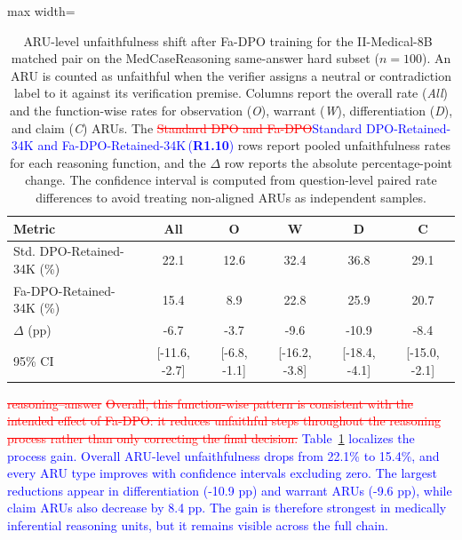 \documentclass[a4paper,fleqn,doubleblind]{cas-sc}
\DeclareRobustCommand{\deleted}[1]{\textcolor{red}{\sout{#1}}}
\DeclareRobustCommand{\added}[1]{\textcolor{blue}{#1}}
\DeclareRobustCommand{\revtag}[1]{\textcolor{blue}{\scriptsize\,(\textbf{#1})}}
\begin{document}
\begin{table}[htbp]
    \centering
    \footnotesize
    \caption[ARU-level unfaithfulness shift after Fa-DPO training.]{ARU-level unfaithfulness shift after Fa-DPO training for the II-Medical-8B~\cite{intelligentinternet2025iimedical8b} matched pair on the MedCaseReasoning same-answer hard subset ($n=100$). An ARU is counted as unfaithful when the verifier assigns a neutral or contradiction label to it against its verification premise. Columns report the overall rate (\textit{All}) and the function-wise rates for observation (\textit{O}), warrant (\textit{W}), differentiation (\textit{D}), and claim (\textit{C}) ARUs. The \deleted{Standard DPO and Fa-DPO}\added{Standard DPO-Retained-34K and Fa-DPO-Retained-34K}\revtag{R1.10} rows report pooled unfaithfulness rates for each reasoning function, and the $\Delta$ row reports the absolute percentage-point change. The confidence interval is computed from question-level paired rate differences to avoid treating non-aligned ARUs as independent samples.}
    \label{tab:iimedical_aru_shift}
    \begin{adjustbox}{max width=\columnwidth}
    \begin{tabular}{lccccc}
        \toprule
        \textbf{Metric} & \textbf{All} & \textbf{O} & \textbf{W} & \textbf{D} & \textbf{C} \\
        \midrule
        Std. DPO-Retained-34K (\%) & 22.1 & 12.6 & 32.4 & 36.8 & 29.1 \\
        Fa-DPO-Retained-34K (\%) & 15.4 & 8.9 & 22.8 & 25.9 & 20.7 \\
        $\Delta$ (pp) & -6.7 & -3.7 & -9.6 & -10.9 & -8.4 \\
        95\% CI & [-11.6, -2.7] & [-6.8, -1.1] & [-16.2, -3.8] & [-18.4, -4.1] & [-15.0, -2.1] \\
        \bottomrule
    \end{tabular}
    \end{adjustbox}
\end{table}

\deleted{reasoning--answer}
\deleted{Overall, this function-wise pattern is consistent with the intended effect of Fa-DPO: it reduces unfaithful steps throughout the reasoning process rather than only correcting the final decision.}
\added{Table~\ref{tab:iimedical_aru_shift} localizes the process gain. Overall ARU-level unfaithfulness drops from 22.1\% to 15.4\%, and every ARU type improves with confidence intervals excluding zero. The largest reductions appear in differentiation (-10.9 pp) and warrant ARUs (-9.6 pp), while claim ARUs also decrease by 8.4 pp. The gain is therefore strongest in medically inferential reasoning units, but it remains visible across the full chain.}
\end{document}
